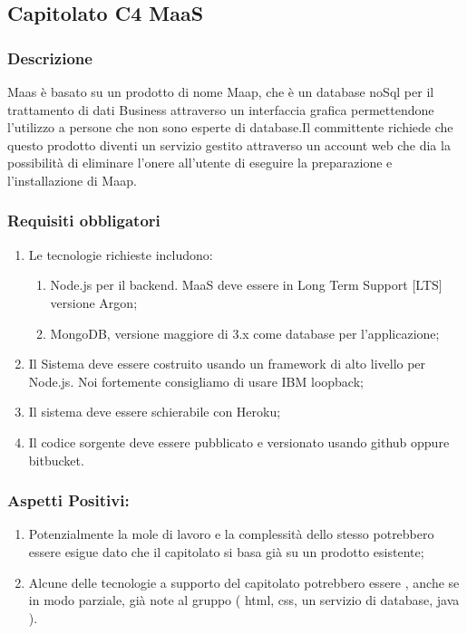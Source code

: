 \documentclass[12pt,a4paper]{article}
\begin{document}
\newpage
\subsection{Capitolato C4 MaaS}
\subsubsection{Descrizione}
Maas è basato su un prodotto di nome Maap, che è un database noSql per il trattamento di dati Business attraverso un interfaccia grafica permettendone l'utilizzo a persone che non sono esperte di database.Il committente richiede che questo prodotto diventi un servizio gestito attraverso un account web che dia la possibilità di eliminare l'onere all'utente di eseguire la preparazione e l'installazione di Maap.

\subsubsection{Requisiti obbligatori}
\begin{enumerate}




\item	Le tecnologie richieste includono:

\begin{enumerate}



\item Node.js per il backend. MaaS deve essere in Long Term Support [LTS] versione Argon;

\item	MongoDB, versione maggiore di 3.x come database per l'applicazione; 

\end{enumerate}

\item Il Sistema deve essere costruito usando un framework di alto livello per Node.js. Noi fortemente consigliamo di usare IBM loopback;

\item Il sistema deve essere schierabile con Heroku;
 
\item	Il codice sorgente deve essere pubblicato e versionato   usando github oppure bitbucket. 
\end{enumerate}
\subsubsection{Aspetti Positivi:}
\begin{enumerate}


\item	Potenzialmente la mole di lavoro e la complessità dello stesso potrebbero essere esigue dato che il capitolato si basa già su un prodotto esistente;

\item	Alcune delle tecnologie a supporto del capitolato potrebbero essere , anche se in modo parziale, già note al gruppo ( html, css, un servizio di	database, java ).
\end{enumerate}
\end{document}
